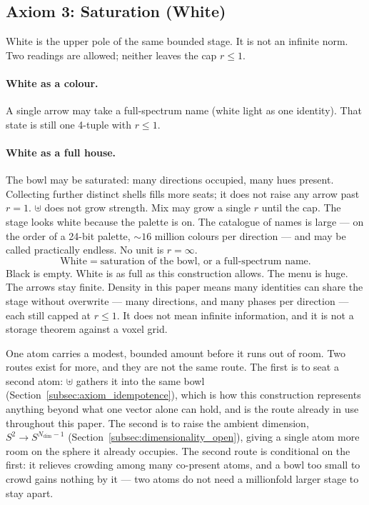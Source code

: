 \documentclass[12pt, a4paper]{article}
\begin{document}
\subsection{Axiom 3: Saturation (White)}
\label{subsec:axiom_white}
White is the upper pole of the same bounded stage. It is not an infinite
norm. Two readings are allowed; neither leaves the cap $r\le 1$.

\paragraph{White as a colour.}
A single arrow may take a full-spectrum name (white light as one
identity). That state is still one 4-tuple with $r\le 1$.

\paragraph{White as a full house.}
The bowl may be saturated: many directions occupied, many hues present.
Collecting further distinct shells fills more seats; it does not raise
any arrow past $r=1$. $\uplus$ does not grow strength. Mix may grow a
single $r$ until the cap. The stage looks white because the palette is on. The catalogue
of names is large --- on the order of a 24-bit palette,
$\sim 16$ million colours per direction --- and may be called
practically endless. No unit is $r=\infty$.
\begin{equation}
    \text{White} \;=\; \text{saturation of the bowl, or a full-spectrum name.}
    \label{eq:white_state}
\end{equation}
Black is empty. White is as full as this construction allows. The
menu is huge. The arrows stay finite.
Density in this paper means many identities can share the stage
without overwrite --- many directions, and many phases per direction
--- each still capped at $r\le 1$. It does not mean infinite
information, and it is not a storage theorem against a voxel grid.

One atom carries a modest, bounded amount before it runs out of room.
Two routes exist for more, and they are not the same route. The first
is to seat a second atom: $\uplus$ gathers it into the same bowl
(Section~\ref{subsec:axiom_idempotence}), which is how this
construction represents anything beyond what one vector alone can
hold, and is the route already in use throughout this paper. The
second is to raise the ambient dimension, $S^2\to S^{N_{\mathrm{dim}}-1}$
(Section~\ref{subsec:dimensionality_open}), giving a single atom more room
on the sphere it already occupies. The second route is conditional on
the first: it relieves crowding among many co-present atoms, and a
bowl too small to crowd gains nothing by it --- two atoms do not
need a millionfold larger stage to stay apart.
\end{document}

